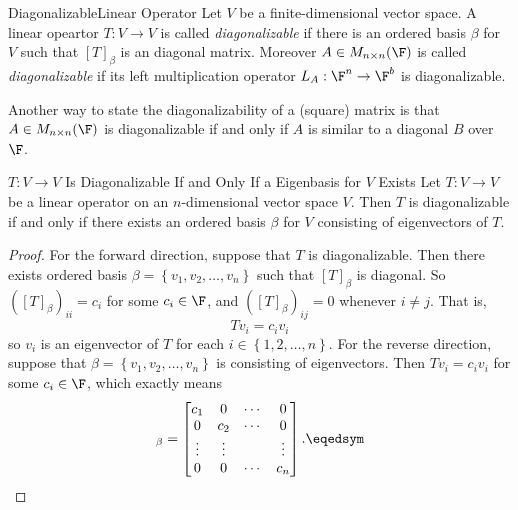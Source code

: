 \documentclass[linearalgebraI]{subfiles}
\begin{document}
    \begin{definition}{Diagonalizable}{Linear Operator}
        Let $V$ be a finite-dimensional vector space. A linear opeartor $T:V\to V$ is called \emph{diagonalizable} if there is an ordered basis $\beta$ for $V$ such that $[T]_\beta$ is an diagonal matrix. Moreover $A\in M_{n\times n}(\F)$ is called \emph{diagonalizable} if its left multiplication operator $L_A:\F^n\to\F^b$ is diagonalizable.
    \end{definition}

    \begin{remark}
        Another way to state the diagonalizability of a (square) matrix is that $A\in M_{n\times n}(\F)$ is diagonalizable if and only if $A$ is similar to a diagonal $B$ over $\F$.
    \end{remark}

    \begin{prop}{$T:V\to V$ Is Diagonalizable If and Only If a Eigenbasis for $V$ Exists}
        Let $T:V\to V$ be a linear operator on an $n$-dimensional vector space $V$. Then $T$ is diagonalizable if and only if there exists an ordered basis $\beta$ for $V$ consisting of eigenvectors of $T$.
    \end{prop}

    \begin{proof}
        For the forward direction, suppose that $T$ is diagonalizable. Then there exists ordered basis $\beta = \left\lbrace v_1, v_2, \ldots, v_n \right\rbrace$ such that $\left[ T \right]_\beta$ is diagonal. So $\left( \left[ T \right]_\beta \right)_{ii} = c_i$ for some $c_i\in \F$, and $\left( \left[ T \right]_\beta \right)_{ij} = 0$ whenever $i\neq j$. That is,
        \begin{equation*}
            Tv_i = c_iv_i
        \end{equation*}
        so $v_i$ is an eigenvector of $T$ for each $i\in \left\lbrace 1, 2, \ldots, n \right\rbrace$. For the reverse direction, suppose that $\beta = \left\lbrace v_1, v_2, \ldots, v_n \right\rbrace$ is consisting of eigenvectors. Then $Tv_i = c_iv_i$ for some $c_i\in \F$, which exactly means
        \begin{equation*}
            [T]_\beta = 
            \begin{bmatrix}
                c_1 & 0 & \cdots & 0 \\ 0 & c_2 & \cdots & 0 \\ \vdots & \vdots & & \vdots \\ 0 & 0 & \cdots & c_n
            \end{bmatrix}. \eqedsym
        \end{equation*}
    \end{proof}
\end{document}
